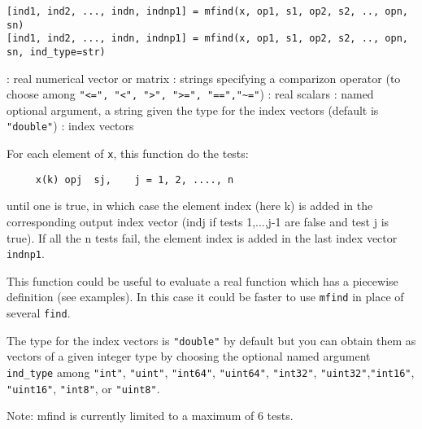 
\begin{mandesc}
\end{mandesc}

\begin{calling_sequence}
\begin{verbatim}
[ind1, ind2, ..., indn, indnp1] = mfind(x, op1, s1, op2, s2, .., opn, sn)
[ind1, ind2, ..., indn, indnp1] = mfind(x, op1, s1, op2, s2, .., opn, sn, ind_type=str)
\end{verbatim}
\end{calling_sequence}
\begin{parameters}
  \begin{varlist}
    :  real numerical vector or matrix
    : strings specifying a comparizon operator (to choose among \verb+"<=", "<", ">", ">=", "==","~="+)
    :  real scalars
    :  named optional argument, a string given the type for the index vectors (default is \verb+"double"+)
    : index vectors
  \end{varlist}
\end{parameters}

\begin{mandescription}
For each element of \verb+x+, this function do the tests:
\begin{verbatim}
     x(k) opj  sj,    j = 1, 2, ...., n
\end{verbatim}
until one is true, in which case the element index (here k) is added in the
corresponding output index vector (indj if tests 1,...,j-1 are false and test j is true).
If all the n tests fail, the element index is added in the last index vector \verb+indnp1+.

This function could be useful to evaluate a real function which has a piecewise definition
(see examples). In this case it could be faster to use \verb+mfind+ in place of several \verb+find+.

The type for the index vectors is \verb+"double"+ by default but you
can obtain them as vectors of a given integer type by choosing the optional named argument
\verb+ind_type+ among \verb+"int"+,  \verb+"uint"+, \verb+"int64"+, \verb+"uint64"+,
\verb+"int32"+, \verb+"uint32"+,\verb+"int16"+, \verb+"uint16"+, \verb+"int8"+, or \verb+"uint8"+.


Note: mfind is currently limited to a maximum of 6 tests.
\end{mandescription}

